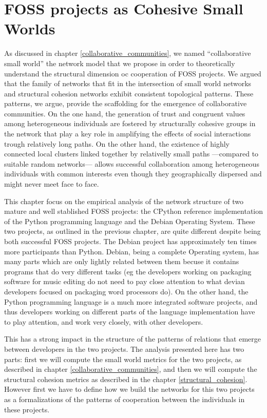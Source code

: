 \chapter{FOSS projects as Cohesive Small Worlds}

As discussed in chapter \ref{collaborative_communities}, we named ``collaborative small world'' the network model that we propose in order to theoretically understand the structural dimension oc cooperation of FOSS projects. We argued that the family of networks that fit in the intersection of small world networks and structural cohesion networks exhibit consistent topological patterns. These patterns, we argue, provide the scaffolding for the emergence of collaborative communities. On the one hand, the generation of trust and congruent values among heterogeneous individuals are fostered by structurally cohesive groups in the network that play a key role in amplifying the effects of social interactions trough relatively long paths. On the other hand, the existence of highly connected local clusters linked together by relativelly small paths ---compared to suitable random networks--- allows successful collaboration among heterogeneous individuals with common interests even though they geographically dispersed and might never meet face to face.

This chapter focus on the empirical analysis of the network structure of two mature and well stablished FOSS projects: the CPython reference implementation of the Python programming language and the Debian Operating System. These two projects, as outlined in the previous chapter, are quite different despite being both successful FOSS projects. The Debian project has approximately ten times more participants than Python. Debian, being a complete Operating system, has many parts which are only lightly related between them becuse it contains programs that do very different tasks (eg the developers working on packaging software for music editing do not need to pay close attention to what devian developers focused on packaging word processors do). On the other hand, the Python programming language is a much more integrated software projects, and thus developers working on different parts of the language implementation have to play attention, and work very closely, with other developers.

This has a strong impact in the structure of the patterns of relations that emerge between developers in the two projects. The analysis presented here has two parts: first we will compute the small world metrics for the two projects, as described in chapter \ref{collaborative_communities}, and then we will compute the structural cohesion metrics as described in the chapter \ref{structural_cohesion}. However first we have to define how we build the networks for this two projects as a formalizations of the patterns of cooperation between the individuals in these projects.


